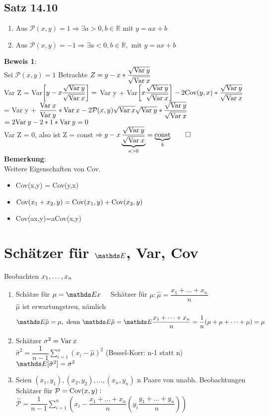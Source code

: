 \subsection{Satz 14.10}\begin{enumerate}
	\item Aus $\mathcal{P}(x,y)=1 \Rightarrow \exists a >0, b\in \mathds{R} \text{ mit } y=ax+b$
	\item Aus $\mathcal{P}(x,y)=-1 \Rightarrow\exists a<0,b\in \mathds{R}, \text{ mit } y = ax+b$
\end{enumerate}
\textbf{Beweis 1}:\\
Sei $\mathcal{P}(x,y)=1$ Betrachte $Z=y-x*\dfrac{\sqrt{\text{Var} \: y}}{\sqrt{\text{Var}\: x}}$\smallskip\\
Var Z = Var$\left[y-x \dfrac{\sqrt{\text{Var}\: y}}{\sqrt{\text{Var}\:x}}\right] =$ Var y + Var$\left[x\dfrac{\sqrt{\text{Var}\:y}}{\sqrt{\text{Var}\:x}}\right]-2\text{Cov}(y,x)*\dfrac{\sqrt{\text{Var} \:y}}{\sqrt{\text{Var}\:x}}$\smallskip\\
= Var y + $\dfrac{\text{Var} \: x}{\text{Var} \:y}*\text{Var} \: x - 2 \mathcal{P}(x,y)\sqrt{\text{Var}\:x}\sqrt{\text{Var} \:y}*\dfrac{\sqrt{\text{Var} \:y}}{\sqrt{\text{Var}\:x}}$\smallskip\\
$=2\text{Var}\:y-2*1*\text{Var}\: y = 0$\medskip\\
Var Z = 0, also ist Z = const $\Rightarrow y-x \underbrace{\dfrac{\sqrt{\text{Var}\:y}}{\sqrt{\text{Var}\: x}}}_{a>0} = \underbrace{\text{const}}_b \qed$\medskip\\
\textbf{Bemerkung}:\\
Weitere Eigenschaften von Cov.
\begin{itemize}
	\item Cov(x,y) = Cov(y,x)
	\item $\text{Cov}(x_1+x_2,y) = \text{Cov}(x_1,y)+\text{Cov}(x_2,y)$
	\item Cov(ax,y)=aCov(x,y)
\end{itemize}
\section{Schätzer für $\E$, Var, Cov}
Beobachten $x_1,\dots,x_n$ 
\begin{enumerate}
	\item Schätze für $\mu = \E x \quad$ Schätzer für $\mu: \hat{\mu}=\dfrac{x_1+\dots+x_n}{n}$\\
	$\hat{\mu}$ ist erwartungstreu, nämlich 
	$$\E\hat{\mu}=\mu, \text{ denn } \E \hat{\mu} = \E \dfrac{x_1+\dots+x_n}{n}=\dfrac{1}{n}(\mu+\mu+\dots+\mu)=\mu$$
	\item Schätzer $\sigma^2 = \text{Var}\: x$\smallskip\\
	$\hat{\sigma}^2 = \dfrac{1}{n-1}\sum_{i=1}^n(x_i-\hat{\mu})^2$ (Bessel-Korr: n-1 statt n)\smallskip\\
	$\E [\hat{\sigma}^2]=\sigma^2$ 
	\item Seien $(x_1,y_1),(x_2,y_2),\dots,(x_n,y_n)$ n Paare von unabh. Beobachtungen\smallskip\\
	Schätzer für $\mathcal{P}=\text{Cov}(x,y):$\\
	$\hat{\mathcal{P}} = \dfrac{1}{n-1}\sum_{i=1}^n(x_i-\dfrac{x_1+\dots+x_n}{n}(y_i\dfrac{y_1+\dots+y_n}{n}))$\medskip\\
\end{enumerate}
